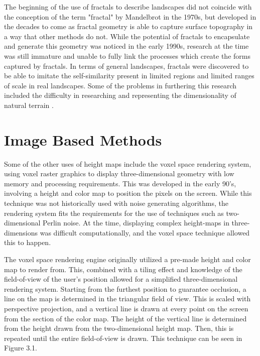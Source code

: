 \documentclass[10pt]{report}
\begin{document}
		The beginning of the use of fractals to describe landscapes did not coincide with the conception of the term "fractal" by Mandelbrot in the 1970s, but developed in the decades to come as fractal geometry is able to capture surface topography in a way that other methods do not. While the potential of fractals to encapsulate and generate this geometry was noticed in the early 1990s, research at the time was still immature and unable to fully link the processes which create the forms captured by fractals. In terms of general landscapes, fractals were discovered to be able to imitate the self-similarity present in limited regions and limited ranges of scale in real landscapes. Some of the problems in furthering this research included the difficulty in researching and representing the dimensionality of natural terrain \cite{XU1993245}. 
		
	\vspace{10pt}
	\let\clearpage\relax
	\chapter{Image Based Methods}
	
		Some of the other uses of height maps include the voxel space rendering system, using voxel raster graphics to display three-dimensional geometry with low memory and processing requirements. This was developed in the early 90's, involving a height and color map to position the pixels on the screen. While this technique was not historically used with noise generating algorithms, the rendering system fits the requirements for the use of techniques such as two-dimensional Perlin noise. At the time, displaying complex height-maps in three-dimensions was difficult computationally, and the voxel space technique allowed this to happen. 
		
		The voxel space rendering engine originally utilized a pre-made height and color map to render from. This, combined with a tiling effect and knowledge of the field-of-view of the user's position allowed for a simplified three-dimensional rendering system. Starting from the furthest position to guarantee occlusion, a line on the map is determined in the triangular field of view. This is scaled with perspective projection, and a vertical line is drawn at every point on the screen from the section of the color map. The height of the vertical line is determined from the height drawn from the two-dimensional height map. Then, this is repeated until the entire field-of-view is drawn. This technique can be seen in Figure 3.1. 
		
\end{document}
